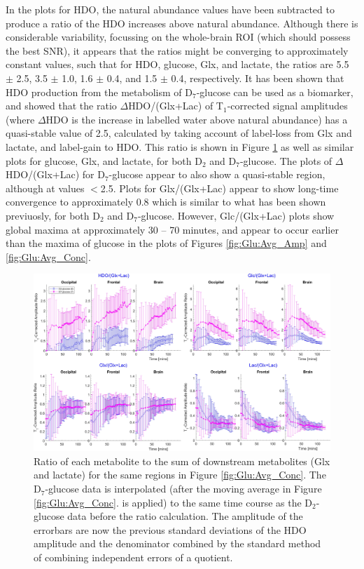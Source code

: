 \documentclass[class=article, crop=false]{standalone}
\begin{document}
In the plots for HDO, the natural abundance values have been subtracted to produce a ratio of the HDO increases above natural abundance. Although there is considerable variability, focussing on the whole-brain ROI (which should possess the best SNR), it appears that the ratios might be converging to approximately constant values, such that for HDO, glucose, Glx, and lactate, the ratios are 5.5 $\pm$ 2.5, 3.5 $\pm$ 1.0, 1.6 $\pm$ 0.4, and 1.5 $\pm$ 0.4, respectively. It has been shown that HDO production from the metabolism of D$_7$-glucose can be used as a biomarker\cite{Mahar2021DeuteratedGlucose}, and showed that the ratio $\Delta$HDO/(Glx+Lac) of T$_1$-corrected signal amplitudes (where $\Delta$HDO is the increase in labelled water above natural abundance) has a quasi-stable value of 2.5, calculated by taking account of label-loss from Glx and lactate, and label-gain to HDO. This ratio is shown in Figure \ref{fig:Glu:HDO_Rat} as well as similar plots for glucose, Glx, and lactate, for both D$_2$ and D$_7$-glucose. The plots of $\Delta$HDO/(Glx+Lac) for D$_7$-glucose appear to also show a quasi-stable region, although at values $<$2.5. Plots for Glx/(Glx+Lac) appear to show long-time convergence to approximately 0.8 which is similar to what has been shown previuosly\cite{Kaggie2022DeuteriumMetabolism}, for both D$_2$ and D$_7$-glucose. However, Glc/(Glx+Lac) plots show global maxima at approximately 30 – 70 minutes, and appear to occur earlier than the maxima of glucose in the plots of Figures \ref{fig:Glu:Avg_Amp} and \ref{fig:Glu:Avg_Conc}.  

\begin{figure}
    \centering
    \includegraphics[width = 1\textwidth]{Figures/Glucose/HDO_Ratio.png}
    \caption{Ratio of each metabolite to the sum of downstream metabolites (Glx and lactate) for the same regions in Figure \ref{fig:Glu:Avg_Conc}. The D$_7$-glucose data is interpolated (after the moving average in Figure \ref{fig:Glu:Avg_Conc}. is applied) to the same time course as the D$_2$-glucose data before the ratio calculation. The amplitude of the errorbars are now the previous standard deviations of the HDO amplitude and the denominator combined by the standard method of combining independent errors of a quotient.}
    \label{fig:Glu:HDO_Rat}
\end{figure}
\end{document}
